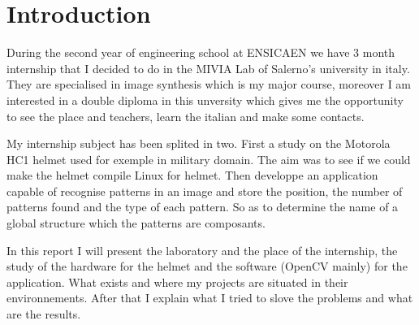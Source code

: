 \chapter{Introduction}

\par During the second year of engineering school at ENSICAEN we have 3 month internship that I decided to do in the MIVIA Lab of Salerno's university in italy. They are specialised in image synthesis which is my major course, moreover I am interested in a double diploma in this unversity which gives me the opportunity to see the place and teachers, learn the italian and make some contacts.
\par My internship subject has been splited in two. First a study on the Motorola HC1 helmet used for exemple in military domain. The aim was to see if we could make the helmet compile Linux for helmet. Then developpe an application capable of recognise patterns in an image and store the position, the number of patterns found and the type of each pattern. So as to determine the name of a global structure which the patterns are composants.
\par In this report I will present the laboratory and the place of the internship, the study of the hardware for the helmet and the software (OpenCV mainly) for the application. What exists and where my projects are situated in their environnements. After that I explain what I tried to slove the problems and what are the results.